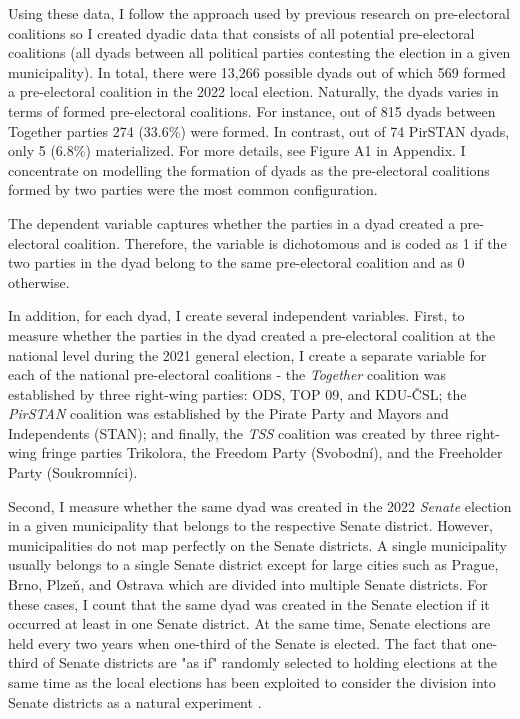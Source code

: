 \documentclass[]{interact}
\theoremstyle{plain}%
\theoremstyle{definition}
\theoremstyle{remark}
\begin{document}
Using these data, I follow the approach used by previous research on pre-electoral coalitions \citep{golder2005,ibenskas2016} so I created dyadic data that consists of all potential pre-electoral coalitions (all dyads between all political parties contesting the election in a given municipality). In total, there were 13,266 possible dyads out of which 569 formed a pre-electoral coalition in the 2022 local election. Naturally, the dyads varies in terms of formed pre-electoral coalitions. For instance, out of 815 dyads between Together parties 274 (33.6\%) were formed. In contrast, out of 74 PirSTAN dyads, only 5 (6.8\%) materialized. For more details, see Figure A1 in Appendix. I concentrate on modelling the formation of dyads as the pre-electoral coalitions formed by two parties were the most common configuration.

The dependent variable captures whether the parties in a dyad created a pre-electoral coalition. Therefore, the variable is dichotomous and is coded as 1 if the two parties in the dyad belong to the same pre-electoral coalition and as 0 otherwise. 

In addition, for each dyad, I create several independent variables. 
First, to measure whether the parties in the dyad created a pre-electoral coalition at the national level during the 2021 general election, I create a separate variable for each of the national pre-electoral coalitions - the \emph{Together} coalition was established by three right-wing parties: ODS, TOP 09, and KDU-ČSL; the \emph{PirSTAN} coalition was established by the Pirate Party and Mayors and Independents (STAN); and finally, the \emph{TSS} coalition was created by three right-wing fringe parties Trikolora, the Freedom Party (Svobodní), and the Freeholder Party (Soukromníci). 

Second, I measure whether the same dyad was created in the 2022 \emph{Senate} election in a given municipality that belongs to the respective Senate district. However, municipalities do not map perfectly on the Senate districts. A single municipality usually belongs to a single Senate district except for large cities such as Prague, Brno, Plzeň, and Ostrava which are divided into multiple Senate districts. For these cases, I count that the same dyad was created in the Senate election if it occurred at least in one Senate district. At the same time, Senate elections are held every two years when one-third of the Senate is elected. The fact that one-third of Senate districts are "as if" randomly selected to holding elections at the same time as the local elections has been exploited to consider the division into Senate districts as a natural experiment \citep[cf.][]{roberts2018,lysek2022}. 
\end{document}
